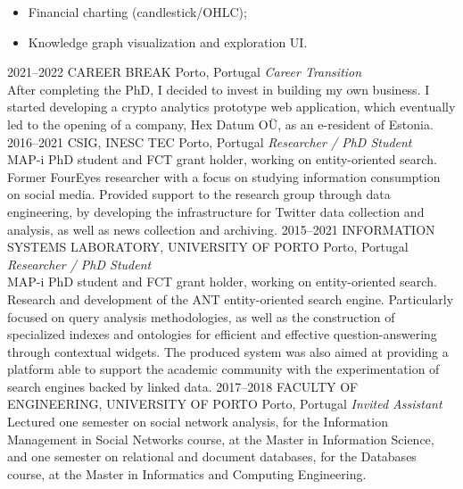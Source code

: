\documentclass{friggeri-cv}
\begin{document}
\begin{entrylist}
{{\begin{itemize}
  \item Financial charting (candlestick/OHLC);
  \item Knowledge graph visualization and exploration UI.
\end{itemize}}}
\entry
{2021--2022}
{CAREER BREAK}
{Porto, Portugal}
{\emph{Career Transition}\\
After completing the PhD, I decided to invest in building my own business. I started developing a crypto analytics prototype web application, which eventually led to the opening of a company, Hex Datum OÜ, as an e-resident of Estonia.}
\entry
{2016--2021}
{CSIG, INESC TEC}
{Porto, Portugal}
{\emph{Researcher / PhD Student}\\
MAP-i PhD student and FCT grant holder, working on entity-oriented search. Former FourEyes researcher with a focus on studying information consumption on social media. Provided support to the research group through data engineering, by developing the infrastructure for Twitter data collection and analysis, as well as news collection and archiving.}
\entry
{2015--2021}
{INFORMATION SYSTEMS LABORATORY, UNIVERSITY OF PORTO}
{Porto, Portugal}
{\emph{Researcher / PhD Student}\\
MAP-i PhD student and FCT grant holder, working on entity-oriented search. Research and development of the ANT entity-oriented search engine. Particularly focused on query analysis methodologies, as well as the construction of specialized indexes and ontologies for efficient and effective question-answering through contextual widgets. The produced system was also aimed at providing a platform able to support the academic community with the experimentation of search engines backed by linked data.}
\entry
{2017--2018}
{FACULTY OF ENGINEERING, UNIVERSITY OF PORTO}
{Porto, Portugal}
{\emph{Invited Assistant}\\
Lectured one semester on social network analysis, for the Information Management in Social Networks course, at the Master in Information Science, and one semester on relational and document databases, for the Databases course, at the Master in Informatics and Computing Engineering.}
\end{entrylist}
\end{document}
